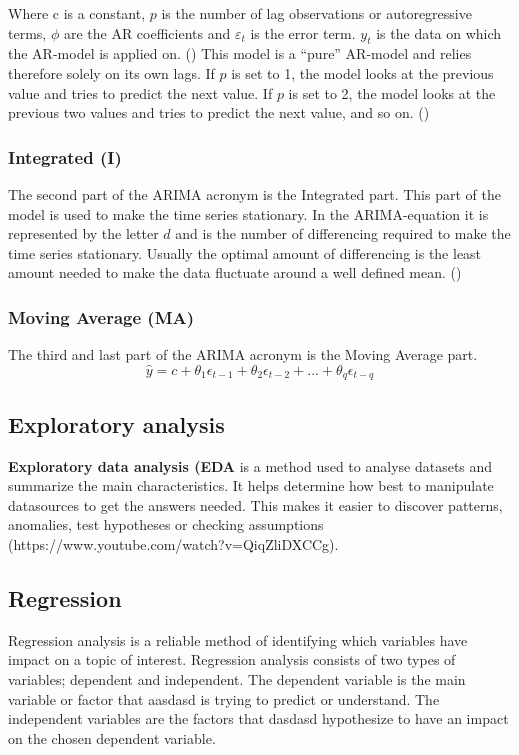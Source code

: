 Where c is a constant, $p$ is the number of lag observations or autoregressive terms, $\phi$ are the AR coefficients and $\varepsilon_{t}$ is the error term. $y_{t}$ is the data on which the AR-model is applied on. (\cite{oracle_ARIMA}) This model is a ``pure'' AR-model and relies therefore solely on its own lags. If $p$ is set to 1, the model looks at the previous value and tries to predict the next value. If $p$ is set to 2, the model looks at the previous two values and tries to predict the next value, and so on. (\cite{artley_2022})


\subsubsection{Integrated (I)}
The second part of the ARIMA acronym is the Integrated part. This part of the model is used to make the time series stationary. In the ARIMA-equation it is represented by the letter $d$ and is the number of differencing required to make the time series stationary. Usually the optimal amount of differencing is the least amount needed to make the data fluctuate around a well defined mean. (\cite{nau_2019}) 

\subsubsection{Moving Average (MA)}
The third and last part of the ARIMA acronym is the Moving Average part.
\begin{equation}
\hat{y} = c + \theta_1\epsilon_{t-1} + \theta_2\epsilon_{t-2} + ... + \theta_q\epsilon_{t-q}
\end{equation}

\subsection{Exploratory analysis}
\textbf{Exploratory data analysis (EDA} is a method used to analyse datasets and summarize the main characteristics. It helps determine how best to manipulate datasources to get the answers needed. This makes it easier to discover patterns, anomalies, test hypotheses or checking assumptions (https://www.youtube.com/watch?v=QiqZliDXCCg).

\subsection{Regression}
Regression analysis is a reliable method of identifying which variables have impact on a topic of interest. Regression analysis consists of two types of variables; dependent and independent. The dependent variable is the main variable or factor that aasdasd is trying to predict or understand. The independent variables are the factors that dasdasd hypothesize to have an impact on the chosen dependent variable. 

